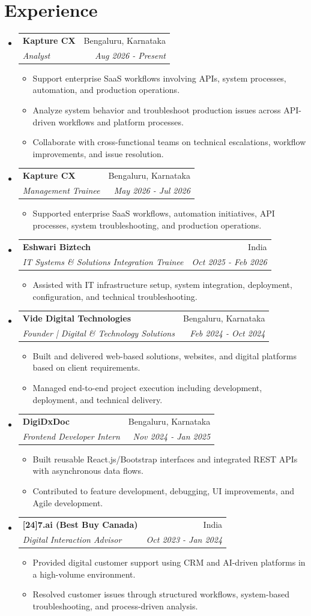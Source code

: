 \documentclass[a4paper,9pt]{article}
\makeatletter
\newcommand{\resumeItem}[1]{
  \item\small{
    {#1 \vspace{-1pt}}
  }
}
\newcommand{\resumeSubheading}[4]{
  \vspace{-1pt}\item
    \begin{tabular*}{0.98\textwidth}[t]{l@{\extracolsep{\fill}}r}
      \textbf{#1} & #2 \\
      \textit{\small#3} & \textit{\small #4} \\
    \end{tabular*}\vspace{-5pt}
}
\newcommand{\resumeSubHeadingListStart}{\begin{itemize}[leftmargin=0.15in, label={}]}
\newcommand{\resumeSubHeadingListEnd}{\end{itemize}}
\newcommand{\resumeItemListStart}{\begin{itemize}[leftmargin=0.15in]}
\newcommand{\resumeItemListEnd}{\end{itemize}\vspace{-3pt}}
\makeatother
\begin{document}
\section{Experience}
  \resumeSubHeadingListStart
    \resumeSubheading
      {Kapture CX}{Bengaluru, Karnataka}
      {Analyst}{Aug 2026 - Present}
    \resumeItemListStart
      \resumeItem{Support enterprise SaaS workflows involving APIs, system processes, automation, and production operations.}
      \resumeItem{Analyze system behavior and troubleshoot production issues across API-driven workflows and platform processes.}
      \resumeItem{Collaborate with cross-functional teams on technical escalations, workflow improvements, and issue resolution.}
    \resumeItemListEnd
    \resumeSubheading
      {Kapture CX}{Bengaluru, Karnataka}
      {Management Trainee}{May 2026 - Jul 2026}
    \resumeItemListStart
      \resumeItem{Supported enterprise SaaS workflows, automation initiatives, API processes, system troubleshooting, and production operations.}
    \resumeItemListEnd
    \resumeSubheading
      {Eshwari Biztech}{India}
      {IT Systems \& Solutions Integration Trainee}{Oct 2025 - Feb 2026}
    \resumeItemListStart
      \resumeItem{Assisted with IT infrastructure setup, system integration, deployment, configuration, and technical troubleshooting.}
    \resumeItemListEnd
    \resumeSubheading
      {Vide Digital Technologies}{Bengaluru, Karnataka}
      {Founder | Digital \& Technology Solutions}{Feb 2024 - Oct 2024}
    \resumeItemListStart
      \resumeItem{Built and delivered web-based solutions, websites, and digital platforms based on client requirements.}
      \resumeItem{Managed end-to-end project execution including development, deployment, and technical delivery.}
    \resumeItemListEnd
    \resumeSubheading
      {DigiDxDoc}{Bengaluru, Karnataka}
      {Frontend Developer Intern}{Nov 2024 - Jan 2025}
    \resumeItemListStart
      \resumeItem{Built reusable React.js/Bootstrap interfaces and integrated REST APIs with asynchronous data flows.}
      \resumeItem{Contributed to feature development, debugging, UI improvements, and Agile development.}
    \resumeItemListEnd
    \resumeSubheading
      {[24]7.ai (Best Buy Canada)}{India}
      {Digital Interaction Advisor}{Oct 2023 - Jan 2024}
    \resumeItemListStart
      \resumeItem{Provided digital customer support using CRM and AI-driven platforms in a high-volume environment.}
      \resumeItem{Resolved customer issues through structured workflows, system-based troubleshooting, and process-driven analysis.}
    \resumeItemListEnd
  \resumeSubHeadingListEnd
\end{document}

